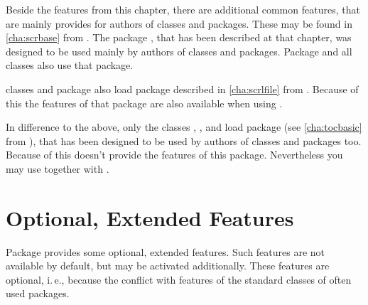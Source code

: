Beside the features from this chapter, there are additional common features,
that are mainly provides for authors of classes and packages. These may be
found in \autoref{cha:scrbase} from . The package
, that has been described at
that chapter, was designed to be used mainly by authors of classes and
packages. Package  and all \KOMAScript{} classes also use
that package.

\KOMAScript{} classes and package  also load package
 described in
\autoref{cha:scrlfile} from . Because of this the
features of that package are also available when using .

\iftrue %
In difference to the above, only the \KOMAScript{} classes ,
, and  load package  (see
\autoref{cha:tocbasic} from ), that has been
designed to be used by authors of classes and packages too. Because of this
 doesn't provide the features of this package. Nevertheless
you may use  together with .%
\fi




\section{Optional, Extended Features}
\label{sec:scrextend.optionalFeatures}

Package  provides some optional, extended features. Such
features are not available by default, but may be activated
additionally. These features are optional, i.\,e., because the conflict with
features of the standard classes of often used packages.

